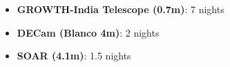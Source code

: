 \begin{itemize}[leftmargin=*, nosep]
    \item \textbf{GROWTH-India Telescope (0.7m)}: 7 nights
    \item \textbf{DECam (Blanco 4m)}: 2 nights
    \item \textbf{SOAR (4.1m)}: 1.5 nights
\end{itemize}
